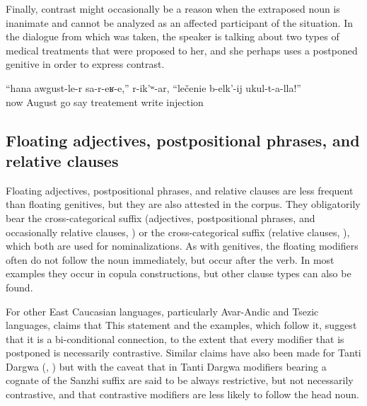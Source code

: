Finally, contrast might occasionally be a reason when the extraposed noun is inanimate and cannot be analyzed as an affected participant of the situation. In the dialogue from which  was taken, the speaker is talking about two types of medical treatments that were proposed to her, and she perhaps uses a postponed genitive in order to express contrast.
%
\begin{exe}
	\ex	\label{ex:She said, come now in August, to prescribe the cure of injections}
	\gll	``hana	awgust-le-r	sa-r-eʁ-e,''	r-ik'ʷ-ar,	``lečenie	b-elk'-ij ukul-t-a-lla!''\\
		now	August	go	say	treatement	write	injection\\
	\glt	{}
\end{exe}



\subsection{Floating adjectives, postpositional phrases, and relative clauses}
\label{ssec:Extraposed adjectives, postpositional phrases, and relative clauses}

Floating adjectives, postpositional phrases, and relative clauses are less frequent than floating genitives, but they are also attested in the corpus. They obligatorily bear the cross-categorical suffix  (adjectives, postpositional phrases, and occasionally relative clauses, ) or the cross-categorical suffix  (relative clauses, ), which both are used for nominalizations. As with genitives, the floating modifiers often do not follow the noun immediately, but occur after the verb. In most examples they occur in copula constructions, but other clause types can also be found.

For other East Caucasian languages, particularly Avar-Andic and Tsezic languages, \citet{Testelec1998a} claims that  This statement and the examples, which follow it, suggest that it is a bi-conditional connection, to the extent that every modifier that is postponed is necessarily contrastive. Similar claims have also been made for Tanti Dargwa (\citealt{Lander2014, Lander2016}, \citealt{Sumbatova.Lander2014}) but with the caveat that in Tanti Dargwa modifiers bearing a cognate of the Sanzhi suffix  are said to be always restrictive, but not necessarily contrastive, and that contrastive modifiers are less likely to follow the head noun.

